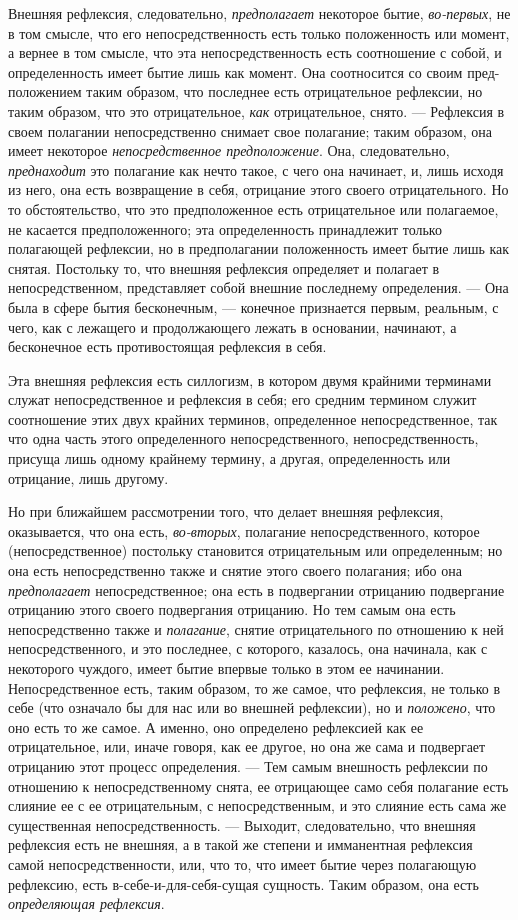 Внешняя рефлексия, следовательно, {\em предполагает}
некоторое бытие, {\em во-первых}, не в том смысле, что
его непосредственность есть только положенность или момент, а вернее в том
смысле, что эта непосредственность есть соотношение с собой, и
определенность имеет бытие лишь как момент. Она соотносится со своим
пред-положением таким образом, что последнее есть отрицательное рефлексии,
но таким образом, что это отрицательное, {\em как}
отрицательное, снято. — Рефлексия в своем полагании непосредственно снимает
свое полагание; таким образом, она имеет некоторое
{\em непосредственное предположение}. Она,
следовательно, {\em преднаходит} это полагание как
нечто такое, с чего она начинает, и, лишь исходя из него, она есть
возвращение в себя, отрицание этого своего отрицательного. Но то
обстоятельство, что это предположенное есть отрицательное или полагаемое,
не касается предположенного; эта определенность принадлежит только
полагающей рефлексии, но в предполагании положенность имеет бытие лишь как
снятая. Постольку то, что внешняя рефлексия определяет и полагает в
непосредственном, представляет собой внешние последнему определения. — Она
была в сфере бытия бесконечным, — конечное признается первым, реальным, с
чего, как с лежащего и продолжающего лежать в основании, начинают, а
бесконечное есть противостоящая рефлексия в себя.

Эта внешняя рефлексия есть силлогизм, в котором двумя крайними терминами
служат непосредственное и рефлексия в себя; его средним термином служит
соотношение этих двух крайних терминов, определенное непосредственное, так
что одна часть этого определенного непосредственного, непосредственность,
присуща лишь одному крайнему термину, а другая, определенность или
отрицание, лишь другому.

Но при ближайшем рассмотрении того, что делает внешняя рефлексия,
оказывается, что она есть, {\em во-вторых}, полагание
непосредственного, которое (непосредственное) постольку становится
отрицательным или определенным; но она есть непосредственно также и снятие
этого своего полагания; ибо она {\em предполагает}
непосредственное; она есть в подвергании отрицанию подвергание отрицанию
этого своего подвергания отрицанию. Но тем самым она есть непосредственно
также и {\em полагание}, снятие отрицательного по
отношению к ней непосредственного, и это последнее, с которого, казалось,
она начинала, как с некоторого чуждого, имеет бытие впервые только в этом
ее начинании. Непосредственное есть, таким образом, то же самое, что
рефлексия, не только в себе (что означало бы для нас или во внешней
рефлексии), но и {\em положено}, что оно есть то же
самое. А именно, оно определено рефлексией как ее отрицательное, или, иначе
говоря, как ее другое, но она же сама и подвергает отрицанию этот процесс
определения. — Тем самым внешность рефлексии по отношению к
непосредственному снята, ее отрицающее само себя полагание есть слияние ее
с ее отрицательным, с непосредственным, и это слияние есть сама же
существенная непосредственность. — Выходит, следовательно, что внешняя
рефлексия есть не внешняя, а в такой же степени и имманентная рефлексия
самой непосредственности, или, что то, что имеет бытие через полагающую
рефлексию, есть в-себе-и-для-себя-сущая сущность. Таким образом, она есть
{\em определяющая рефлексия}.


